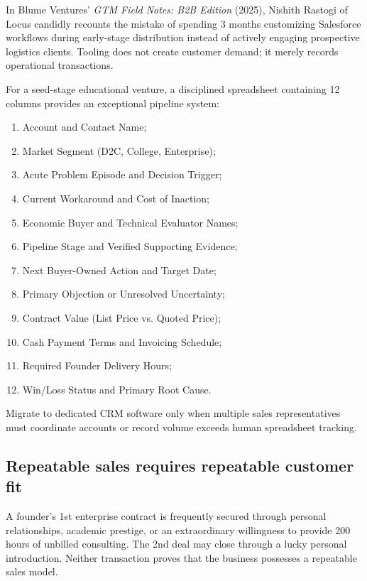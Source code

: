 In Blume Ventures' \textit{GTM Field Notes: B2B Edition} (2025), Nishith Rastogi of Locus candidly recounts the mistake of spending 3 months customizing Salesforce workflows during early-stage distribution instead of actively engaging prospective logistics clients. Tooling does not create customer demand; it merely records operational transactions.

For a seed-stage educational venture, a disciplined spreadsheet containing 12 columns provides an exceptional pipeline system:
\begin{enumerate}
\item Account and Contact Name;
\item Market Segment (D2C, College, Enterprise);
\item Acute Problem Episode and Decision Trigger;
\item Current Workaround and Cost of Inaction;
\item Economic Buyer and Technical Evaluator Names;
\item Pipeline Stage and Verified Supporting Evidence;
\item Next Buyer-Owned Action and Target Date;
\item Primary Objection or Unresolved Uncertainty;
\item Contract Value (List Price vs. Quoted Price);
\item Cash Payment Terms and Invoicing Schedule;
\item Required Founder Delivery Hours;
\item Win/Loss Status and Primary Root Cause.
\end{enumerate}
Migrate to dedicated CRM software only when multiple sales representatives must coordinate accounts or record volume exceeds human spreadsheet tracking.

\subsection{Repeatable sales requires repeatable customer fit}

A founder's 1st enterprise contract is frequently secured through personal relationships, academic prestige, or an extraordinary willingness to provide 200 hours of unbilled consulting. The 2nd deal may close through a lucky personal introduction. Neither transaction proves that the business possesses a repeatable sales model.

